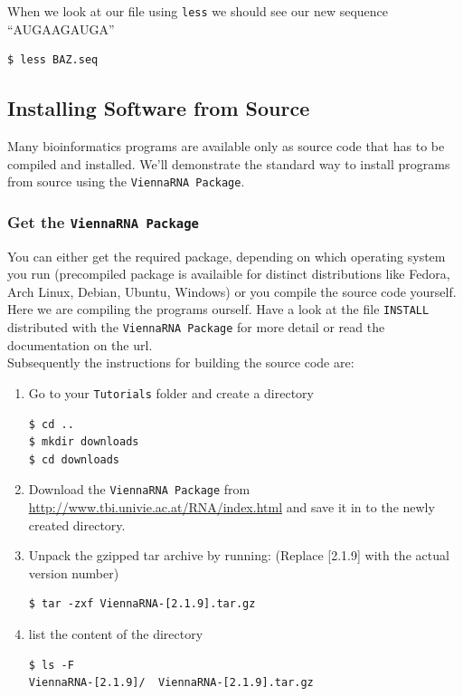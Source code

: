 \documentclass[a4paper]{article}
\newcommand{\frametitle}[1]{\subsubsection{#1}}
\begin{document}
When we look at our file using \texttt{less} we should see our new sequence ``AUGAAGAUGA''
\begin{verbatim}
$ less BAZ.seq
\end{verbatim}

\subsection{Installing Software from Source}
\label{sect:install}

Many bioinformatics programs are available only as source code that has to
be compiled and installed. We'll demonstrate the standard way to install
programs from source using the \texttt{ViennaRNA Package}.

 \frametitle{Get the \texttt{ViennaRNA Package}}
You can either get the required package, depending on which operating system you run 
(precompiled package is availaible for distinct distributions like Fedora, Arch Linux, Debian, Ubuntu, 
Windows) or you compile the source code yourself. Here we are compiling the programs ourself.
Have a look at the file \texttt{INSTALL} distributed with the \texttt{ViennaRNA Package} 
for more detail or read the documentation on the url. \\

Subsequently the instructions for building the source code are:

  \begin{enumerate}
  \item Go to your \texttt{Tutorials} folder and create a directory 
\begin{verbatim}
$ cd ..
$ mkdir downloads
$ cd downloads
\end{verbatim}
  \item Download the \texttt{ViennaRNA Package} from
    \url{http://www.tbi.univie.ac.at/RNA/index.html} and save it in to the newly created
    directory.
  \item Unpack the gzipped tar archive by running: (Replace [2.1.9] with the actual version number)
\begin{verbatim}
$ tar -zxf ViennaRNA-[2.1.9].tar.gz
\end{verbatim}
  \item list the content of the directory
\begin{verbatim}
$ ls -F
ViennaRNA-[2.1.9]/  ViennaRNA-[2.1.9].tar.gz
\end{verbatim}
  \end{enumerate}
\end{document}
